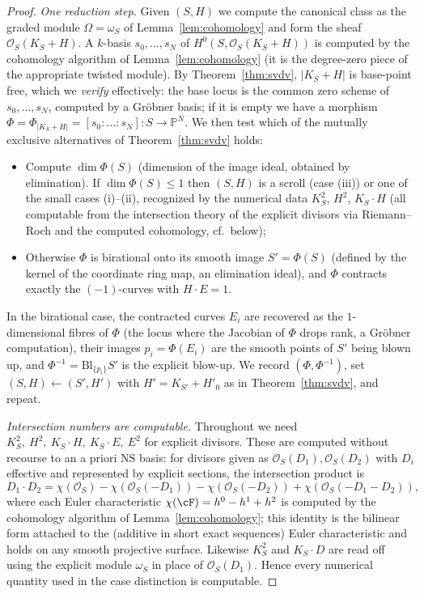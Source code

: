 \documentclass{amsart}
\theoremstyle{plain}
\theoremstyle{definition}
\newcommand{\PP}{\mathbb{P}}
\newcommand{\cO}{\mathcal{O}}
\begin{document}
\begin{proof}
\emph{One reduction step.}  Given $(S,H)$ we compute the canonical class as the
graded module $\Omega=\omega_S$ of Lemma~\ref{lem:cohomology} and form the sheaf
$\cO_S(K_S+H)$.  A $k$-basis $s_0,\dots,s_N$ of
$H^0(S,\cO_S(K_S+H))$ is computed by the cohomology algorithm of
Lemma~\ref{lem:cohomology} (it is the degree-zero piece of the appropriate
twisted module).  By Theorem~\ref{thm:svdv}, $|K_S+H|$ is base-point free, which
we \emph{verify} effectively: the base locus is the common zero scheme of
$s_0,\dots,s_N$, computed by a Gr\"obner basis; if it is empty we have a morphism
$\Phi=\Phi_{|K_S+H|}=[s_0:\dots:s_N]\colon S\to\PP^N$.  We then test which of the
mutually exclusive alternatives of Theorem~\ref{thm:svdv} holds:
\begin{itemize}
\item Compute $\dim\Phi(S)$ (dimension of the image ideal, obtained by
elimination).  If $\dim\Phi(S)\le1$ then $(S,H)$ is a scroll (case (iii)) or one
of the small cases (i)--(ii), recognized by the numerical data
$K_S^2$, $H^2$, $K_S\cdot H$ (all computable from the intersection theory of the
explicit divisors via Riemann--Roch and the computed cohomology, cf.\ below);
\item Otherwise $\Phi$ is birational onto its smooth image $S'=\Phi(S)$ (defined
by the kernel of the coordinate ring map, an elimination ideal), and $\Phi$
contracts exactly the $(-1)$-curves with $H\cdot E=1$.
\end{itemize}
In the birational case, the contracted curves $E_i$ are recovered as the
$1$-dimensional fibres of $\Phi$ (the locus where the Jacobian of $\Phi$ drops
rank, a Gr\"obner computation), their images $p_i=\Phi(E_i)$ are the smooth points
of $S'$ being blown up, and $\Phi^{-1}=\mathrm{Bl}_{\{p_i\}}S'$ is the explicit
blow-up.  We record $(\Phi,\Phi^{-1})$, set $(S,H)\leftarrow(S',H')$ with
$H'=K_{S'}+H'_0$ as in Theorem~\ref{thm:svdv}, and repeat.

\emph{Intersection numbers are computable.}  Throughout we need
$K_S^2,\ H^2,\ K_S\cdot H,\ K_S\cdot E,\ E^2$ for explicit divisors.  These are
computed without recourse to an a priori $\mathrm{NS}$ basis: for divisors given
as $\cO_S(D_1),\cO_S(D_2)$ with $D_i$ effective and represented by explicit
sections, the intersection product is
\[
D_1\cdot D_2=\chi(\cO_S)-\chi(\cO_S(-D_1))-\chi(\cO_S(-D_2))+\chi(\cO_S(-D_1-D_2)),
\]
where each Euler characteristic
$\chi(\cF)=h^0-h^1+h^2$ is computed by the cohomology algorithm of
Lemma~\ref{lem:cohomology}; this identity is the bilinear form attached to the
(additive in short exact sequences) Euler characteristic and holds on any smooth
projective surface.  Likewise $K_S^2$ and $K_S\cdot D$ are read off using the
explicit module $\omega_S$ in place of $\cO_S(D_1)$.  Hence every numerical
quantity used in the case distinction is computable.


\end{proof}
\end{document}
